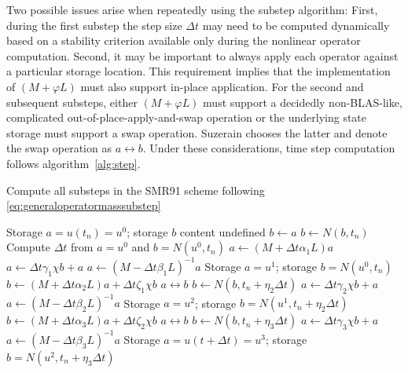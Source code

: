 \documentclass[letterpaper,11pt,nointlimits,reqno,draft]{amsbook}
\begin{document}
Two possible issues arise when repeatedly using the substep algorithm: First,
during the first substep the step size $\Delta{}t$ may need to be computed
dynamically based on a stability criterion available only during the nonlinear
operator computation.  Second, it may be important to always apply each
operator against a particular storage location.  This requirement implies that
the implementation of $\left(M+\varphi{}L\right)$ must also support in-place
application.  For the second and subsequent substeps, either
$\left(M+\varphi{}L\right)$ must support a decidedly non-BLAS-like, complicated
out-of-place-apply-and-swap operation or the underlying state storage must
support a swap operation.  Suzerain chooses the latter and denote the swap operation
as $a\leftrightarrow{}b$.  Under these considerations, time step computation
follows algorithm~\vref{alg:step}.

\begin{algorithm}
\caption{Compute all substeps in the SMR91 scheme following
         \autoref{eq:generaloperatormasssubstep}
         }
\label{alg:step}
\begin{algorithmic}
  \renewcommand{\algorithmiccomment}[1]{\hfill{}// #1}
  \REQUIRE Storage $a = u\left(t_{n}\right) = u^{0} $;
           storage $b$ content undefined
  \STATE $b\leftarrow{}a$
  \STATE $b\leftarrow{}N\left(b,t_{n}\right)$
  \STATE Compute $\Delta{}t$ from $a=u^0$ and $b=N\left(u^0,t_{n}\right)$
  \STATE $a\leftarrow{}\left(M+\Delta{}t\alpha_{1}L\right)a$
  \STATE $a\leftarrow{}\Delta{}t \gamma_{1} \chi{} b + a$
  \STATE $a\leftarrow{}\left(M-\Delta{}t\beta_{1}L\right)^{-1}a$
  \ENSURE Storage $a = u^1$;
          storage $b = N\left(u^{0},t_{n}\right)$
  \STATE $b\leftarrow{}   \left(M+\Delta{}t\alpha_{2}L\right)a
                        + \Delta{}t\zeta_{1}\chi{}b$
  \STATE $a\leftrightarrow{}b$
  \STATE $b\leftarrow{}N\left(b,t_{n}+\eta_{2}\Delta{}t\right)$
  \STATE $a\leftarrow{}\Delta{}t \gamma_{2} \chi{} b + a$
  \STATE $a\leftarrow{}\left(M-\Delta{}t\beta_{2}L\right)^{-1}a$
  \ENSURE Storage $a = u^{2}$;
          storage $b = N\left(u^{1},t_{n}+\eta_{2}\Delta{}t\right)$
  \STATE $b\leftarrow{}   \left(M+\Delta{}t\alpha_{3}L\right)a
                        + \Delta{}t\zeta_{2}\chi{}b$
  \STATE $a\leftrightarrow{}b$
  \STATE $b\leftarrow{}N\left(b,t_{n}+\eta_{3}\Delta{}t\right)$
  \STATE $a\leftarrow{}\Delta{}t \gamma_{3} \chi{}b + a$
  \STATE $a\leftarrow{}\left(M-\Delta{}t\beta_{3}L\right)^{-1}a$
  \ENSURE Storage $a = u\left(t+\Delta{}t\right)= u^{3}$;
          storage $b = N\left(u^{2},t_{n}+\eta_{3}\Delta{}t\right)$
\end{algorithmic}
\end{algorithm}
\end{document}

